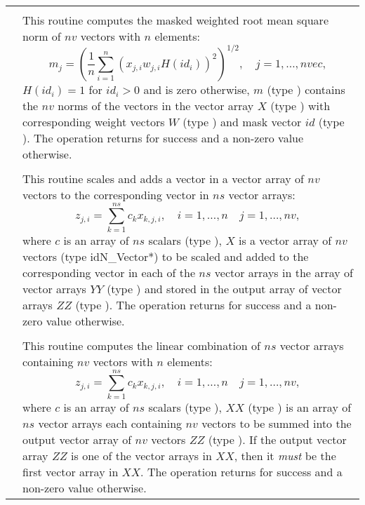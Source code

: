 \begin{xtabular}{|p{\colonec}|p{\coltwoc}|}
 &  \\
& This routine computes the masked weighted root mean square norm of $nv$
vectors with $n$ elements:
\begin{equation*}
m_j = \left( \frac1n \sum_{i=1}^{n} \left(x_{j,i} w_{j,i}
H(id_i)\right)^2 \right)^{1/2}, \quad j=1,\ldots,nvec,
\end{equation*}
$H(id_i)=1$ for $id_i > 0$ and is zero otherwise, $m$ (type ) contains
the $nv$ norms of the vectors in the vector array $X$ (type ) with
corresponding weight vectors $W$ (type ) and mask vector $id$
(type ). The operation returns  for success and a non-zero
value otherwise.
\\[2mm]

 &  \\ 
& This routine scales and adds a vector in a vector array of $nv$ vectors to
the corresponding vector in $ns$ vector arrays:
\begin{equation*}
z_{j,i} = \sum_{k=1}^{ns} c_k x_{k,j,i}, \quad i=1,\ldots,n \quad j=1,\ldots,nv,
\end{equation*}
where $c$ is an array of $ns$ scalars (type ), $X$ is a vector
array of $nv$ vectors (type id{N\_Vector*}) to be scaled and added to the
corresponding vector in each of the $ns$ vector arrays in the array of vector
arrays $YY$ (type ) and stored in the output array of vector
arrays $ZZ$ (type ). The operation returns  for success
and a non-zero value otherwise.
\\[2mm]

 &  \\ 
& This routine computes the linear combination of $ns$ vector arrays containing
$nv$ vectors with $n$ elements:
\begin{equation*}
z_{j,i} = \sum_{k=1}^{ns} c_k x_{k,j,i}, \quad i=1,\ldots,n \quad j=1,\ldots,nv,
\end{equation*}
where $c$ is an array of $ns$ scalars (type ), $XX$
(type ) is an array of $ns$ vector arrays each containing $nv$
vectors to be summed into the output vector array of $nv$ vectors $ZZ$ (type
). If the output vector array $ZZ$ is one of the vector arrays in
$XX$, then it \textit{must} be the first vector array in $XX$. The operation
returns  for success and a non-zero value otherwise.
\\[2mm]

\end{xtabular}
\bigskip


